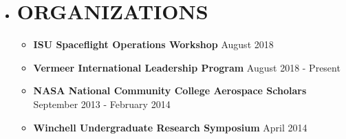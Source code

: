 \documentclass[overlapped, 11pt]{res}
\begin{document}
\begin{resume}
\begin{itemize}
    \item[]\section{ORGANIZATIONS}
        \begin{itemize}
            \item[] \textbf{ISU Spaceflight Operations Workshop}
                \hfill August 2018
            \item[] \textbf{Vermeer International Leadership Program}
                \hfill August 2018 - Present
            \item[] \textbf{NASA National Community College Aerospace Scholars}
                \hfill September 2013 - February 2014
            \item[] \textbf{Winchell Undergraduate Research Symposium}
                \hfill April 2014
        \end{itemize}

    \end{itemize}
    \end{resume}
\end{document}

